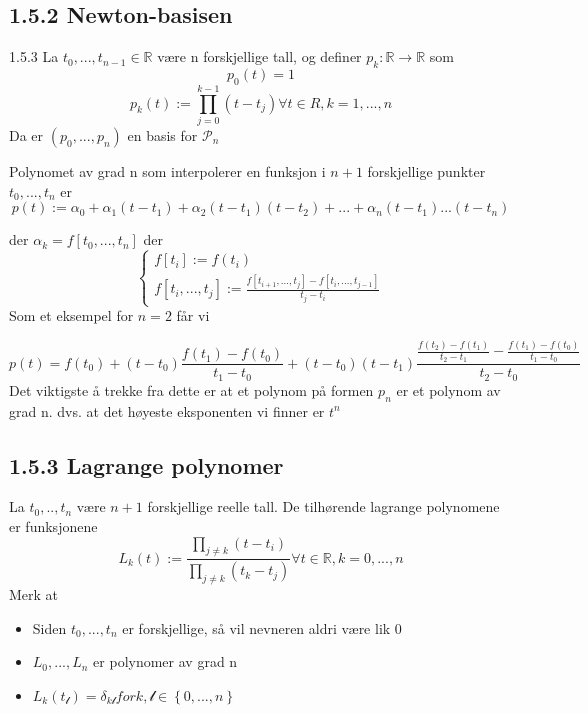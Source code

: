 \documentclass[a4paper,norsk]{article}
\begin{document}
\subsection*{1.5.2 Newton-basisen}

\begin{propositionbox}{1.5.3}{}
La $ t_0, ..., t_{n-1} \in \mathbb{R} $ være n forskjellige tall, og definer $ p_k : \mathbb{R} \rightarrow \mathbb{R} $ som
\[
    p_0(t) = 1
\]
\[
    p_k(t) := \prod_{j=0}^{k-1} \left( t - t_j \right)  \forall t \in R, k = 1, ..., n
\]
Da er $ \left( p_0, ..., p_n \right)  $ en basis for $ \mathcal{P}_n $ 
\end{propositionbox}

Polynomet av grad n som interpolerer en funksjon i $ n+1 $ forskjellige punkter $ t_0, ..., t_n $ er 
\[
    p(t) := \alpha_{0}^{} + \alpha_{1}^{} \left( t - t_1 \right) + \alpha_{2}^{} \left( t - t_1 \right) \left( t - t_2 \right) + ... + \alpha_{n}^{} \left( t- t_1 \right) ... \left( t - t_n \right) 
\]

der $ \alpha_{k}^{} = f \left[ t_0, ..., t_n \right]  $ 
der 
\[
    \begin{cases}
        f \left[ t_i \right] := f(t_i)\\
        f \left[ t_i, ..., t_j \right] := \frac{ f \left[ t_{i+1}, ..., t_j \right] - f \left[ t_i, ..., t_{j-1} \right] }{ t_j - t_i }
    \end{cases}
\]
Som et eksempel for $ n=2 $ får vi

\[
    p(t) = f(t_0) + \left( t-t_0 \right) \frac{ f(t_1) - f(t_0) }{ t_1 - t_0 } + \left( t - t_0 \right) \left( t - t_1 \right) \frac{ \frac{ f(t_2) - f(t_1) }{ t_2 - t_1 } - \frac{ f(t_1) - f(t_0) }{ t_1 - t_0 } }{ t_2 - t_0 }
\]
Det viktigste å trekke fra dette er at et polynom på formen $ p_n $ er et polynom av grad n. dvs. at det høyeste eksponenten vi finner er $ t^n $ 

\subsection*{1.5.3 Lagrange polynomer}

La $ t_0, .., t_{n} $ være $ n+1 $ forskjellige reelle tall. De tilhørende lagrange polynomene er funksjonene
\[
    L_k(t) := \frac{ \prod_{j\neq k} \left( t - t_i \right)  }{ \prod_{j\neq k}  \left( t_k - t_j  \right) } \forall t \in \mathbb{R}, k=0, ..., n
\]
Merk at 
\begin{itemize}
    \item Siden $ t_0, ..., t_n $ er forskjellige, så vil nevneren aldri være lik 0
    \item $ L_0, ..., L_n $ er polynomer av grad n
    \item $ L_k(t_{ \mathcal{l}}) = \delta_{k \mathcal{l}} for k, \mathcal{l} \in \left\{ 0, ..., n \right\}  $ 
\end{itemize}
\end{document}
